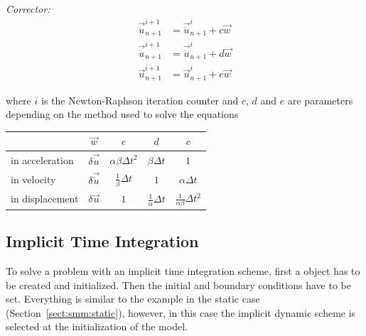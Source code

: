 \noindent\textit{Corrector:}
\begin{align}
  \vec{\ddot{u}}_{n+1}^{i+1} &= \vec{\ddot{u}}_{n+1}^{i} +c \vec{w} \\
  \vec{\dot{u}}_{n+1}^{i+1} &= \vec{\dot{u}}_{n+1}^{i} + d\vec{w} \\
  \vec{u}_{n+1}^{i+1} &= \vec{u}_{n+1}^{i} + e \vec{w}
\end{align}

where $i$ is the Newton-Raphson iteration counter and $c$, $d$ and $e$
are parameters depending on the method used to solve the equations

\begin{center}
  \begin{tabular}{lcccc}
    \toprule
    & $\vec{w}$ & $e$ & $d$ & $c$\\
    \midrule
    in acceleration &$ \delta\vec{\ddot{u}}$ & $\alpha \beta\Delta t^2$ &$\beta \Delta t$ &$1$\\
    in velocity & $ \delta\vec{\dot{u}}$& $\frac{1}{\beta} \Delta t$ & $1$ & $\alpha\Delta t$\\
    in displacement &$\delta\vec{u}$ & $ 1$ & $\frac{1}{\alpha} \Delta t$ & $\frac{1}{\alpha \beta} \Delta t^2$\\
    \bottomrule
  \end{tabular}
\end{center}



\subsection{Implicit Time Integration}
To solve a problem with an implicit time integration scheme, first a
 object has to be created and initialized.
Then the initial and boundary conditions have to be set.  Everything
is similar to the example in the static case
(Section~\ref{sect:smm:static}), however, in this case the implicit
dynamic scheme is selected at the initialization of the model.

